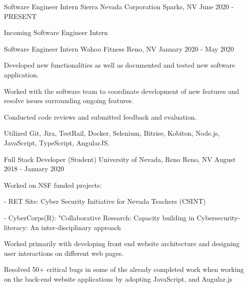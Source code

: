 
\begin{cventries}
  \cventry
    {Software Engineer Intern} %
    {Sierra Nevada Corporation} %
    {Sparks, NV} %
    {June 2020 - PRESENT} %
    {
      \begin{cvitems} %
        \item {Incoming Software Engineer Intern}
      \end{cvitems}
    }

  \cventry
    {Software Engineer Intern} %
    {Wahoo Fitness} %
    {Reno, NV} %
    {January 2020 - May 2020} %
    {
      \begin{cvitems} %
        \item {Developed new functionalities as well as documented and tested new software application.}
        \item {Worked with the software team to coordinate development of new features and resolve issues surrounding ongoing features.}
        \item { Conducted code reviews and submitted feedback and evaluation.}
        \item { Utilized Git, Jira, TestRail, Docker, Selenium, Bitrise, Kobiton, Node.js, JavaScript, TypeScript, AngularJS.}
      \end{cvitems}
    }
 \newcommand{\SubItem}[1]{
        {\setlength\itemindent{15pt} \item[-] #1}
    }
  \cventry
    {Full Stack Developer (Student)} %
    {University of Nevada, Reno} %
    {Reno, NV} %
    {August 2018 - January 2020} %
    {
      \begin{cvitems} %
        \item {Worked on NSF funded projects:}
        \SubItem{RET Site: Cyber Security Initiative for Nevada Teachers (CSINT)}
        \SubItem{CyberCorps(R): "Collaborative Research: Capacity building in Cybersecurity-literacy: An inter-disciplinary approach}
        \item {Worked primarily with developing front end website architecture and designing user interactions on different web pages.}
        \item {Resolved 50+ critical bugs in some of the already completed work when working on the back-end website applications by adopting JavaScript, and Angular.js }
      \end{cvitems}
    }


\end{cventries}
